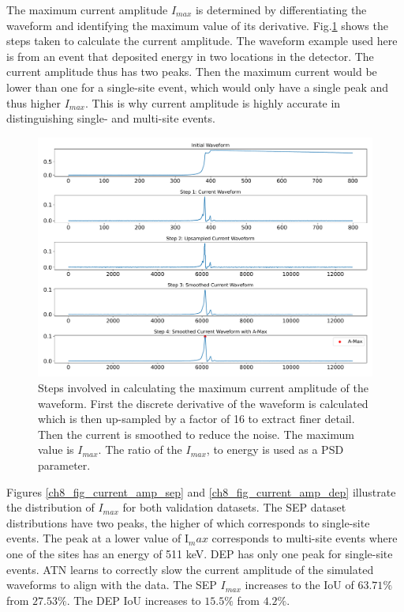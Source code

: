 The maximum current amplitude $I_{max}$ is determined by differentiating the waveform and identifying the maximum value of its derivative. Fig.\ref{fig_ch8_curr_amp_calc} shows the steps taken to calculate the current amplitude. The waveform example used here is from an event that deposited energy in two locations in the detector. The current amplitude thus has two peaks. Then the maximum current would be lower than one for a single-site event, which would only have a single peak and thus higher $I_{max}$. This is why current amplitude is highly accurate in distinguishing single- and multi-site events.


\begin{figure}%
    \centering
    \includegraphics[width=0.99\linewidth, trim={0.4cm 0pc 0.3cm 0pc},clip]{ch8/figs/curr_amp_calc.pdf}
    \caption{Steps involved in calculating the maximum current amplitude of the waveform. First the discrete derivative of the waveform is calculated which is then up-sampled by a factor of 16 to extract finer detail. Then the current is smoothed to reduce the noise. The maximum value is $I_{max}$. The ratio of the $I_{max}$, to energy is used as a PSD parameter.}
    \label{fig_ch8_curr_amp_calc}
\end{figure}

Figures \ref{ch8_fig_current_amp_sep} and \ref{ch8_fig_current_amp_dep} illustrate the distribution of $I_{max}$ for both validation datasets. The SEP dataset distributions have two peaks, the higher of which corresponds to single-site events. The peak at a lower value of I$_max$ corresponds to multi-site events where one of the sites has an energy of 511 keV. DEP has only one peak for single-site events. ATN learns to correctly slow the current amplitude of the simulated waveforms to align with the data. The SEP $I_{max}$ increases to the IoU of $63.71\%$ from $27.53\%$. The DEP IoU increases to $15.5\%$ from $4.2\%$. 
  
